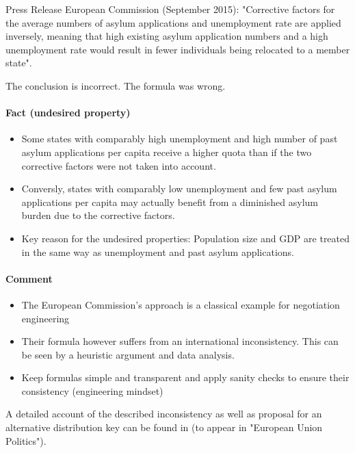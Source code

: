 Press Release European Commission (September 2015):
"Corrective factors for the average numbers of asylum applications and unemployment
rate are applied inversely, meaning that high existing asylum application numbers
and a high unemployment rate would result in fewer individuals being relocated
to a member state".

\vspace{1\baselineskip}

The conclusion is incorrect. The formula was wrong.

\paragraph{Fact (undesired property)}
\begin{itemize}
    \item Some states with comparably high unemployment and high number of
        past asylum applications per capita receive a higher quota than if the
        two corrective factors were not taken into account.
    \item Conversly, states with comparably low unemployment and few past asylum
        applications per capita may actually benefit from a diminished asylum
        burden due to the corrective factors.
    \item Key reason for the undesired properties: Population size and GDP are
        treated in the same way as unemployment and past asylum applications.
\end{itemize}

\paragraph{Comment}

\begin{itemize}
    \item The European Commission's approach is a classical example for
        negotiation engineering
    \item Their formula however suffers from an international inconsistency.
        This can be seen by a heuristic argument and data analysis.
    \item Keep formulas simple and transparent and apply sanity checks to
        ensure their consistency (engineering mindset)
\end{itemize}

A detailed account of the described inconsistency as well as proposal for an
alternative distribution key can be found in (to appear in "European Union
Politics").


